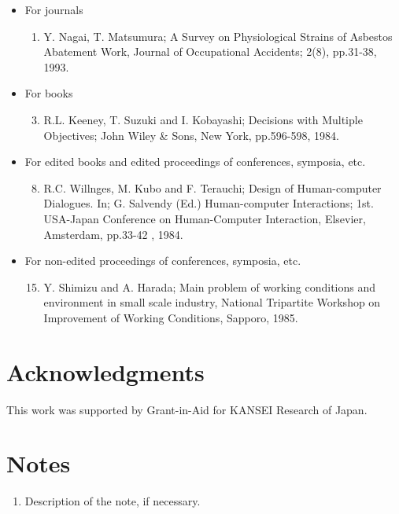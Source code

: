 \documentclass[a4paper,10pt,conference,compsoc]{ISASE}
\begin{document}
\begin{itemize}[noitemsep]
    \item For journals
        \begin{enumerate}[noitemsep]
            \item Y. Nagai, T. Matsumura; A Survey on Physiological Strains of Asbestos
                Abatement Work, Journal of Occupational Accidents; 2(8), pp.31-38, 1993.
        \end{enumerate}
    \item For books
        \begin{enumerate}[noitemsep]
            \setcounter{enumi}{2}
            \item R.L. Keeney, T. Suzuki and I. Kobayashi; Decisions with Multiple
                Objectives; John Wiley \& Sons, New York, pp.596-598, 1984.
        \end{enumerate}
    \item For edited books and edited proceedings of conferences, symposia,
        etc.
        \begin{enumerate}[noitemsep]
            \setcounter{enumi}{7}
            \item R.C. Willnges, M. Kubo and F. Terauchi; Design of
                Human-computer Dialogues. In; G. Salvendy (Ed.) Human-computer
                Interactions; 1st. USA-Japan Conference on Human-Computer
                Interaction, Elsevier, Amsterdam, pp.33-42 , 1984.
        \end{enumerate}
    \item For non-edited proceedings of conferences, symposia, etc.
        \begin{enumerate}[noitemsep]
            \setcounter{enumi}{14}
            \item Y. Shimizu and A. Harada; Main problem of working
                conditions and environment in small scale industry, National
                Tripartite Workshop on Improvement of Working Conditions,
                Sapporo, 1985.
        \end{enumerate}
\end{itemize}



\section*{Acknowledgments}

This work was supported by Grant-in-Aid for KANSEI Research of
Japan.

\section*{Notes}

\begin{enumerate}[noitemsep]
    \item Description of the note, if necessary.
\end{enumerate}


\printbibliography[title=REFERENCES]


\end{document}
